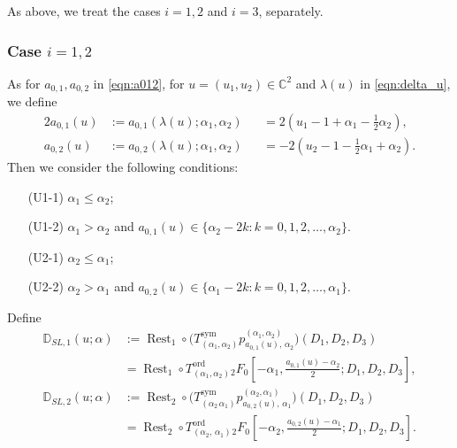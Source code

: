 \documentclass[a4paper,11pt,reqno]{amsart}
\newcommand{\DD}{\mathbb{D}}
\newcommand{\0}{{\bf 0}}
\newcommand{\C}{\mathbb{C}}
\newcommand{\1}{{\bf 1}}
\newcommand{\ord}{{\mathrm{ord}}}
\DeclareMathOperator{\Rest}{Rest}
\theoremstyle{plain}
\theoremstyle{definition}
\numberwithin{equation}{section}
\theoremstyle{definition}
\begin{document}
As above, we treat the cases $i=1,2$ and $i=3$, separately.

\subsubsection{Case \texorpdfstring{$i=1,2$}{i=1,2}}
\label{sec:SL_Case12}

As for $a_{0,1}, a_{0,2}$ in \eqref{eqn:a012},
for $u=(u_1, u_2) \in \C^2$ and $\lambda(u)$ in \eqref{eqn:delta_u}, 
we define
\begin{alignat*}{2}
a_{0,1}(u)
&:=a_{0,1}(\lambda(u);\alpha_1,\alpha_2)
&&=2(u_1-1+\alpha_1-\tfrac{1}{2}\alpha_2),
\\
a_{0,2}(u)
&:=a_{0,2}(\lambda(u);\alpha_1,\alpha_2)
&&= -2(u_2-1-\tfrac{1}{2}\alpha_1+\alpha_2).
\end{alignat*}
Then we consider the following conditions:

\vspace{5pt}

\begin{enumerate}[label=\normalfont{(\arabic*)}]
\item[(U1-1)] $\alpha_1\leq \alpha_2$;
\vspace{5pt}
\item[(U1-2)] $\alpha_1>\alpha_2$ and 
$a_{0,1}(u)\in \{\alpha_2 - 2k: k=0,1,2,\ldots, \alpha_2\}$.
\end{enumerate}

\vspace{5pt}

\begin{enumerate}[label=\normalfont{(\arabic*)}]
\item[(U2-1)] $\alpha_2\leq \alpha_1$;
\vspace{5pt}
\item[(U2-2)] $\alpha_2>\alpha_1$ and 
$a_{0,2}(u)\in \{\alpha_1 - 2k: k=0,1,2,\ldots, \alpha_1\}$.
\end{enumerate}

\vspace{5pt}

Define
\begin{align*}
\DD_{SL,1}(u;\alpha)
&:=\Rest_1\circ
\big(T^{\mathrm{sym}}_{(\alpha_1,\alpha_2)}
p_{a_{0,1}(u),\,\alpha_2}^{(\alpha_1,\alpha_2)}\big)(D_1,D_2,D_3)\\[5pt]
&=\Rest_1\circ 
T^\ord_{(\alpha_1,\alpha_2)}{}_2F_0
[-\alpha_1, \tfrac{a_{0,1}(u)-\alpha_2}{2};  D_1, D_2, D_3],\\[10pt]
\DD_{SL,2}(u;\alpha)
&:=\Rest_2\circ 
\big(T^{\mathrm{sym}}_{(\alpha_2\,\alpha_1)}
p_{a_{0,2}(u),\,\alpha_1}^{(\alpha_2,\alpha_1)}\big)(D_1,D_2,D_3) \\[5pt]
&=\Rest_2\circ  
T^\ord_{(\alpha_2,\,\alpha_1)}
{}_2F_0[-\alpha_2, \tfrac{a_{0,2}(u)-\alpha_1}{2};D_1, D_2, D_3].
\end{align*}
\end{document}
